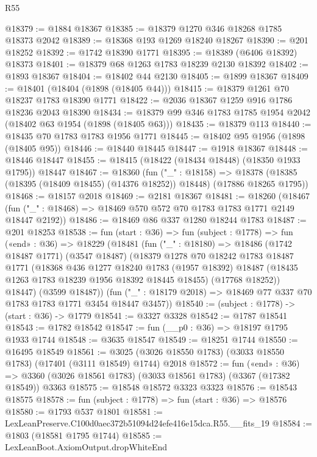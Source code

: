 \begin{lexlean}{R55}
\begin{coremodule}
@18379 := @1884 @18367
@18385 := @18379 @1270 @346 @18268 @1785 @18373 @2042
@18389 := @18368 @193 @1269 @18240 @18267
@18390 := @201 @18252
@18392 := @1742 @18390 @1771
@18395 := @18389 (@6406 @18392) @18373
@18401 := @18379 @68 @1263 @1783 @18239 @2130 @18392
@18402 := @1893 @18367
@18404 := @18402 @44 @2130
@18405 := @1899 @18367
@18409 := @18401 (@18404 (@1898 (@18405 @44)))
@18415 := @18379 @1261 @70 @18237 @1783 @18390 @1771
@18422 := @2036 @18367 @1259 @916 @1786 @18236 @2043 @18390
@18434 := @18379 @99 @346 @1783 @1785 @1954 @2042 (@18402 @63 @1954 (@1898 (@18405 @63)))
@18435 := @18379 @113
@18440 := @18435 @70 @1783 @1783 @1956 @1771
@18445 := @18402 @95 @1956 (@1898 (@18405 @95))
@18446 := @18440 @18445
@18447 := @1918 @18367
@18448 := @18446 @18447
@18455 := @18415 (@18422 (@18434 @18448) (@18350 @1933 @1795)) @18447
@18467 := @18360
    (fun ("_" : @18158) =>
    @18378 (@18385 (@18395 (@18409 @18455) (@14376 @18252)) @18448) (@17886 @18265 @1795))
@18468 := @18157 @2018
@18469 := @2181 @18367
@18481 := @18260
    (@18467 (fun ("_" : @18468) => @18469 @570 @572 @70 @1783 @1783 @1771 @2149 @18447 @2192))
@18486 := @18469 @86 @337 @1280 @18244 @1783
@18487 := @201 @18253
@18538 := fun (start : @36) =>
  fun (subject : @1778) =>
  fun («end» : @36) =>
  @18229
    (@18481
      (fun ("_" : @18180) =>
      @18486
        (@1742 @18487 @1771)
        (@3547 @18487)
        (@18379
          @1278
          @70
          @18242
          @1783
          @18487
          @1771
          (@18368
            @436
            @1277
            @18240
            @1783
            (@1957 @18392)
            @18487
            (@18435 @1263 @1783 @18239 @1956 @18392 @18445 @18455)
            (@17768 @18252))
          @18447)
        (@3599 @18487))
      (fun ("_" : @18179 @2018) => @18469 @77 @337 @70 @1783 @1783 @1771 @3454 @18447 @3457))
@18540 := (subject : @1778) -> (start : @36) -> @1779
@18541 := @3327 @3328
@18542 := @1787 @18541
@18543 := @1782 @18542
@18547 := fun (__p0 : @36) => @18197 @1795 @1933 @1744
@18548 := @3635 @18547
@18549 := @18251 @1744
@18550 := @16495 @18549
@18561 := @3025 (@3026 @18550 @1783) (@3033 @18550 @1783) (@17401 (@3111 @18549) @1744) @2018
@18572 := fun («end» : @36) =>
  @3360 (@3026 @18561 @1783) (@3033 @18561 @1783) (@3367 (@17382 @18549)) @3363
@18575 := @18548 @18572 @3323 @3323
@18576 := @18543 @18575
@18578 := fun (subject : @1778) => fun (start : @36) => @18576
@18580 := @1793 @537 @1801
@18581 := LexLeanPreserve.C100d0aec372b51094d24efe416e15dca.R55.__fits_19
@18584 := @1803 (@18581 @1795 @1744)
@18585 := LexLeanBoot.AxiomOutput.dropWhiteEnd

\end{coremodule}
\end{lexlean}
